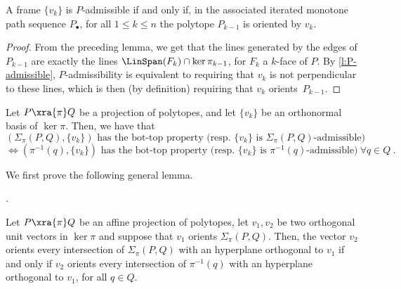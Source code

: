 \begin{lemma} \label{l:KV-BS}
	A frame $\{v_k\}$ is $P$-admissible if and only if, in the associated iterated monotone path sequence $P_\bullet$, for all $1 \leq k \leq n$ the polytope $P_{k-1}$ is oriented by $v_k$.
\end{lemma}

\begin{proof}
	From the preceding lemma, we get that the lines generated by the edges of $P_{k-1}$ are exactly the lines $\LinSpan(F_k)\cap \ker \pi_{k-1}$, for $F_k$ a $k$-face of $P$.
	By \cref{l:P-admissible}, $P$-admissibility is equivalent to requiring that $v_k$ is not perpendicular to these lines, which is then (by definition) requiring that $v_k$ orients~$P_{k-1}$.
\end{proof}


\begin{theorem}	\label{t:bot-top-for-fibers}
	Let $P \xra{\pi} Q$ be a projection of polytopes, and let $\{v_k\}$ be an orthonormal basis of $\ker \pi$.
	Then, we have that
	\[
	(\Sigma_\pi(P,Q),\{v_k\}) \text{ has the bot-top property (resp. } \{v_k\} \text{ is }\Sigma_\pi(P,Q)\text{-admissible)}
	\]
	\[
	\iff (\pi^{-1}(q),\{v_k\}) \text{ has the bot-top property (resp. } \{v_k\} \text{ is }\pi^{-1}(q)\text{-admissible)} \ \forall q \in Q \ .
	\]
\end{theorem}

We first prove the following general lemma.

.

\begin{lemma} \label{l:iterated-orientation}
	Let $P\xra{\pi} Q$ be an affine projection of polytopes, let $v_1, v_2$ be two orthogonal unit vectors in $\ker \pi$ and suppose that $v_1$ orients $\Sigma_\pi (P,Q)$.
	Then, the vector $v_2$ orients every intersection of $\Sigma_\pi (P,Q)$ with an hyperplane orthogonal to $v_1$ if and only if $v_2$ orients every intersection of $\pi^{-1}(q)$ with an hyperplane orthogonal to $v_1$, for all $q \in Q$.
\end{lemma}


